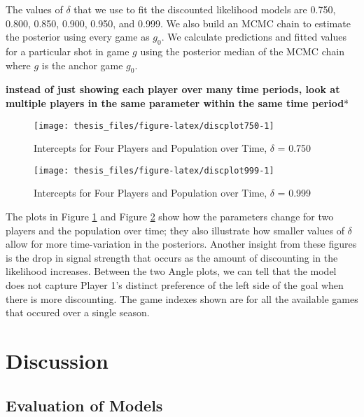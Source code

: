 \documentclass[12pt,twoside]{dukestatscithesis}
\theoremstyle{definition}
\theoremstyle{definition}
\theoremstyle{definition}
\theoremstyle{remark}
\begin{document}
The values of \(\delta\) that we use to fit the discounted likelihood
models are 0.750, 0.800, 0.850, 0.900, 0.950, and 0.999. We also build
an MCMC chain to estimate the posterior using every game as \(g_0\). We
calculate predictions and fitted values for a particular shot in game
\(g\) using the posterior median of the MCMC chain where \(g\) is the
anchor game \(g_0\).

\textbf{instead of just showing each player over many time periods, look
at multiple players in the same parameter within the same time period}*
\begin{figure}

\hfill{}\texttt{[image: thesis\_files/figure-latex/discplot750-1]} 

\caption{Intercepts for Four Players and Population over Time, $\delta$ = 0.750}\label{fig:discplot750}
\end{figure}
\begin{figure}

\hfill{}\texttt{[image: thesis\_files/figure-latex/discplot999-1]} 

\caption{Intercepts for Four Players and Population over Time, $\delta$ = 0.999}\label{fig:discplot999}
\end{figure}
The plots in Figure \ref{fig:discplot750} and Figure
\ref{fig:discplot999} show how the parameters change for two players and
the population over time; they also illustrate how smaller values of
\(\delta\) allow for more time-variation in the posteriors. Another
insight from these figures is the drop in signal strength that occurs as
the amount of discounting in the likelihood increases. Between the two
Angle plots, we can tell that the model does not capture Player 1's
distinct preference of the left side of the goal when there is more
discounting. The game indexes shown are for all the available games that
occured over a single season.

\chapter{Discussion}\label{disc}

\section{Evaluation of Models}\label{evaluation-of-models}
\end{document}
